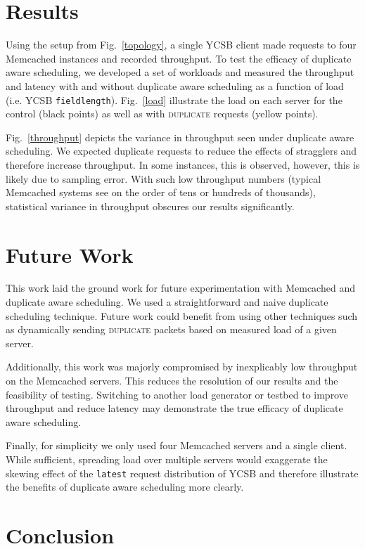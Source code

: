 \documentclass[11pt,titlepage]{article}
\begin{document}
\section{Results}

Using the setup from Fig.~\ref{topology}, a single YCSB client made requests to
four Memcached instances and recorded throughput. To test the efficacy
of duplicate aware scheduling, we developed a set of workloads and measured the
throughput and latency with and without duplicate aware scheduling as a
function of load (i.e. YCSB \texttt{fieldlength}). Fig.~\ref{load}
illustrate the load on each server for the control (black points) as well as
with \textsc{duplicate} requests (yellow points).


Fig.~\ref{throughput} depicts the variance in throughput seen under duplicate
aware scheduling. We expected duplicate requests to reduce the effects of
stragglers and therefore increase throughput. In some instances, this is
observed, however, this is likely due to sampling error. With such low
throughput numbers (typical Memcached systems see on the order of tens or
hundreds of thousands), statistical variance in throughput obscures our results
significantly.

\section{Future Work}

This work laid the ground work for future experimentation with Memcached and
duplicate aware scheduling. We used a straightforward and naive duplicate
scheduling technique. Future work could benefit from using other techniques such
as dynamically sending \textsc{duplicate} packets based on measured load of a
given server.

Additionally, this work was majorly compromised by inexplicably low throughput on
the Memcached servers. This reduces the resolution of our results and the
feasibility of testing. Switching to another load generator or testbed to
improve throughput and reduce latency may demonstrate the true efficacy of
duplicate aware scheduling.

Finally, for simplicity we only used four Memcached servers and a single client.
While sufficient, spreading load over multiple servers would exaggerate the
skewing effect of the \texttt{latest} request distribution of YCSB and therefore
illustrate the benefits of duplicate aware scheduling more clearly.

\section{Conclusion}
\end{document}
